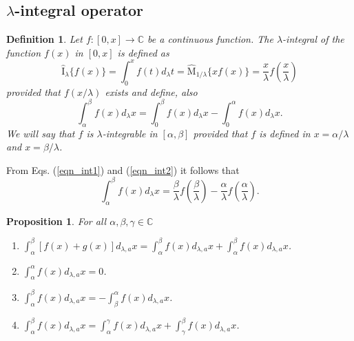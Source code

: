 \documentclass[12pt]{article}
\newcommand{\C}{\mathbb{C}}
\newcommand{\M}{\widehat{\mathrm{M}}}
\newcommand{\I}{\widehat{\mathrm{I}}}
\newtheorem{definition}{Definition}
\newtheorem{proposition}{Proposition}
\begin{document}
\subsection{$\lambda$-integral operator}


\begin{definition}
Let $f:[0,x]\rightarrow\C$ be a continuous function. The $\lambda$-integral of the function $f(x)$ in $[0,x]$ is defined as
    \begin{equation}\label{eqn_int1}
        \I_{\lambda}\{f(x)\}=\int_{0}^{x} f(t)d_\lambda t=
        \M_{1/\lambda}\{xf(x)\}=\frac{x}{\lambda}f\left(\frac{x}{\lambda}\right)
    \end{equation}
provided that $f(x/\lambda)$ exists and define, also
\begin{equation}\label{eqn_int2}
    \int_{\alpha}^{\beta}f(x)d_{\lambda}x=\int_{0}^{\beta}f(x)d_{\lambda}x-\int_{0}^{\alpha}f(x)d_{\lambda}x.
\end{equation}
We will say that $f$ is $\lambda$-integrable in $[\alpha,\beta]$ provided that $f$ is defined in $x=\alpha/\lambda$ and $x=\beta/\lambda$.
\end{definition}
From Eqs. (\ref{eqn_int1}) and (\ref{eqn_int2}) it follows that
\begin{equation}\label{eqn_int_int}
    \int_{\alpha}^{\beta}f(x)d_{\lambda}x=\frac{\beta}{\lambda}f\left(\frac{\beta}{\lambda}\right)-\frac{\alpha}{\lambda}f\left(\frac{\alpha}{\lambda}\right).
\end{equation}


\begin{proposition}
For all $\alpha,\beta,\gamma\in\C$
\begin{enumerate}
    \item $\int_{\alpha}^{\beta}[f(x)+g(x)]d_{\lambda,a}x=\int_{\alpha}^{\beta}f(x)d_{\lambda,a}x+\int_{\alpha}^{\beta}f(x)d_{\lambda,a}x$.
    \item $\int_{\alpha}^{\alpha}f(x)d_{\lambda,a}x=0$.
    \item $\int_{\alpha}^{\beta}f(x)d_{\lambda,a}x=-\int_{\beta}^{\alpha}f(x)d_{\lambda,a}x$.
    \item $\int_{\alpha}^{\beta}f(x)d_{\lambda,a}x=\int_{\alpha}^{\gamma}f(x)d_{\lambda,a}x+\int_{\gamma}^{\beta}f(x)d_{\lambda,a}x$.
\end{enumerate}
\end{proposition}
\end{document}
